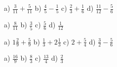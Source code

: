 %
%
%



\begin{tehtava}
a) $\frac{3}{11}+\frac{5}{11}$ \qquad b) $\frac{4}{5}-\frac{1}{5}$ \qquad c) $\frac{2}{3}+\frac{1}{6}$ \qquad
d) $ \frac{11}{12}-\frac{5}{6}$
\begin{vastaus}
a) $\frac{8}{11}$ \qquad b) $\frac{3}{5}$ \qquad c) $\frac{5}{6}$ \qquad d) $\frac{1}{12}$
\end{vastaus}
\end{tehtava}

\begin{tehtava}
a) $1\frac{2}{9}+\frac{5}{9}$ \qquad
b) $\frac{1}{3}+2\frac{1}{3}$ \qquad
c) $2+\frac{5}{4}$ \qquad
d) $ \frac{3}{2}-\frac{5}{6}$
\begin{vastaus}
a) $\frac{16}{9}$ \qquad
b) $\frac{8}{3}$ \qquad
c) $\frac{13}{4}$ \qquad
d) $\frac{2}{3}$
\end{vastaus}
\end{tehtava}

